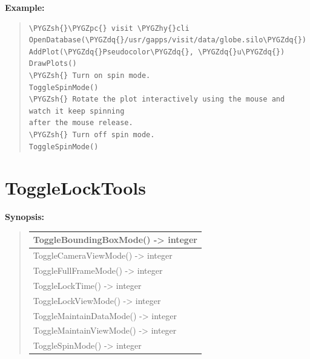 \documentclass[letterpaper,10pt,english]{sphinxmanual}
\def\PYGZsh{\char`\#}
\def\PYGZpc{\char`\%}
\def\PYGZhy{\char`\-}
\def\PYGZdq{\char`\"}
\begin{document}
\begin{DUlineblock}{0em}
\item[] \textbf{Example:}
\item[] 
\end{DUlineblock}
\begin{quote}

\begin{Verbatim}[commandchars=\\\{\}]
\PYGZsh{}\PYGZpc{} visit \PYGZhy{}cli
OpenDatabase(\PYGZdq{}/usr/gapps/visit/data/globe.silo\PYGZdq{})
AddPlot(\PYGZdq{}Pseudocolor\PYGZdq{}, \PYGZdq{}u\PYGZdq{})
DrawPlots()
\PYGZsh{} Turn on spin mode.
ToggleSpinMode()
\PYGZsh{} Rotate the plot interactively using the mouse and watch it keep spinning
after the mouse release.
\PYGZsh{} Turn off spin mode.
ToggleSpinMode()
\end{Verbatim}
\end{quote}


\section{ToggleLockTools}
\label{functions:togglelocktools}
\begin{DUlineblock}{0em}
\item[] \textbf{Synopsis:}
\end{DUlineblock}
\begin{quote}

\begin{tabulary}{\linewidth}{|L|}
\hline

ToggleBoundingBoxMode() -\textgreater{} integer
\\
\hline
ToggleCameraViewMode() -\textgreater{} integer
\\
\hline
ToggleFullFrameMode() -\textgreater{} integer
\\
\hline
ToggleLockTime() -\textgreater{} integer
\\
\hline
ToggleLockViewMode() -\textgreater{} integer
\\
\hline
ToggleMaintainDataMode() -\textgreater{} integer
\\
\hline
ToggleMaintainViewMode() -\textgreater{} integer
\\
\hline
ToggleSpinMode() -\textgreater{} integer
\\
\hline\end{tabulary}

\end{quote}
\end{document}

